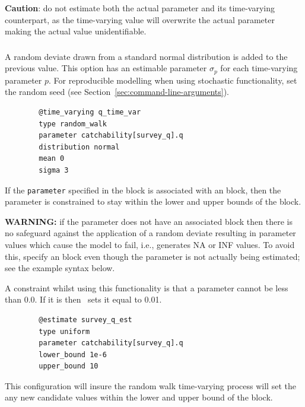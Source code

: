 \textbf{Caution}: do not estimate both the actual parameter and its time-varying counterpart, as the time-varying value will overwrite the actual parameter making the actual value unidentifiable.

\subsubsection[Random Walk]{}

A random deviate drawn from a standard normal distribution is added to the previous value. This option has an estimable parameter $\sigma_p$ for each time-varying parameter $p$. For reproducible modelling when using stochastic functionality, set the random seed (see Section~\ref{sec:command-line-arguments}).

{\small{\begin{verbatim}
		@time_varying q_time_var
		type random_walk
		parameter catchability[survey_q].q
		distribution normal
		mean 0
		sigma 3
		\end{verbatim}}}

If the \texttt{parameter} specified in the  block is associated with an  block, then the parameter is constrained to stay within the lower and upper bounds of the  block.

\textbf{WARNING:} if the parameter does not have an associated  block then there is no safeguard against the application of a random deviate resulting in parameter values which cause the model to fail, i.e., generates NA or INF values. To avoid this, specify an  block even though the parameter is not actually being estimated; see the example syntax below.

A constraint whilst using this functionality is that a parameter cannot be less than 0.0. If it is then \CNAME\ sets it equal to 0.01.

{\small{\begin{verbatim}
		@estimate survey_q_est
		type uniform
		parameter catchability[survey_q].q
		lower_bound 1e-6
		upper_bound 10
		\end{verbatim}}}
	
This configuration will insure the random walk time-varying process will set the any new candidate values within the lower and upper bound of the  block.

\subsubsection[Annual shift]{}

